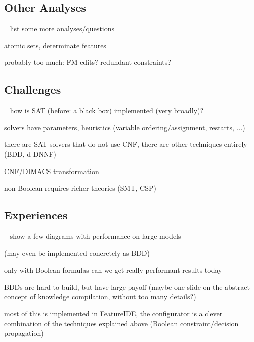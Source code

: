 \subsection{Other Analyses}
\begin{frame}{~}
	list some more analyses/questions

	atomic sets, determinate features

	probably too much:
	FM edits?
	redundant constraints?
\end{frame}

\subsection{Challenges}
\begin{frame}{~}
	how is SAT (before: a black box) implemented (very broadly)?

	solvers have parameters, heuristics (variable ordering/assignment, restarts, ...)

	there are SAT solvers that do not use CNF, there are other techniques entirely (BDD, d-DNNF)

	CNF/DIMACS transformation

	non-Boolean requires richer theories (SMT, CSP)
\end{frame}

\subsection{Experiences} %
\begin{frame}{~}
	show a few diagrams with performance on large models

	(may even be implemented concretely as BDD)

	only with Boolean formulas can we get really performant results today

	BDDs are hard to build, but have large payoff (maybe one slide on the abstract concept of knowledge compilation, without too many details?)

	most of this is implemented in FeatureIDE, the configurator is a clever combination of the techniques explained above (Boolean constraint/decision propagation)
\end{frame}